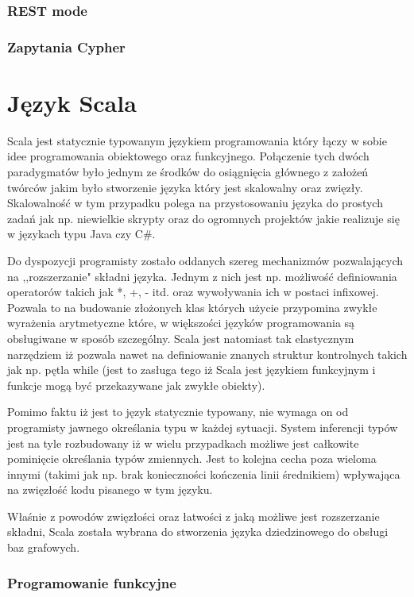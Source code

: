\documentclass[brudnopis]{xmgr}
\begin{document}
\subsection{REST mode}

\subsection{Zapytania Cypher}

\chapter{Język Scala}

Scala jest statycznie typowanym językiem programowania który łączy w sobie idee programowania obiektowego oraz funkcyjnego. Połączenie tych dwóch paradygmatów było jednym ze środków do osiągnięcia głównego z założeń twórców jakim było stworzenie języka który jest skalowalny oraz zwięzły. Skalowalność w tym przypadku polega na przystosowaniu języka do prostych zadań jak np. niewielkie skrypty oraz do ogromnych projektów jakie realizuje się w językach typu Java czy C\#.

Do dyspozycji programisty zostało oddanych szereg mechanizmów pozwalających na ,,rozszerzanie" składni języka. Jednym z nich jest np. możliwość definiowania operatorów takich jak *, +, - itd. oraz wywoływania ich w postaci infixowej. Pozwala to na budowanie złożonych klas których użycie przypomina zwykłe wyrażenia arytmetyczne które, w większości języków programowania są obsługiwane w sposób szczególny. Scala jest natomiast tak elastycznym narzędziem iż pozwala nawet na definiowanie znanych struktur kontrolnych takich jak np. pętla while (jest to zasługa tego iż Scala jest językiem funkcyjnym i funkcje mogą być przekazywane jak zwykłe obiekty).

Pomimo faktu iż jest to język statycznie typowany, nie wymaga on od programisty jawnego określania typu w każdej sytuacji. System inferencji typów jest na tyle rozbudowany iż w wielu przypadkach możliwe jest całkowite pominięcie określania typów zmiennych. Jest to kolejna cecha poza wieloma innymi (takimi jak np. brak konieczności kończenia linii średnikiem) wpływająca na zwięzłość kodu pisanego w tym języku.

Właśnie z powodów zwięzłości oraz łatwości z jaką możliwe jest rozszerzanie składni, Scala została wybrana do stworzenia języka dziedzinowego do obsługi baz grafowych.

\subsection{Programowanie funkcyjne}
\end{document}
